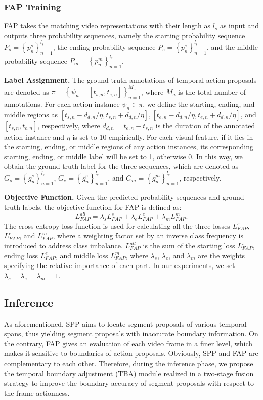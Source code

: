 \documentclass[10pt,twocolumn,letterpaper]{article}
\begin{document}
\subsubsection{ FAP Training}
FAP takes the matching video representations with their length as $l_{s}$  as input and outputs three probability sequences, namely the starting probability sequence 
$P_{s}=\left\{p_{n}^{s}\right\}_{n=1}^{l_s}$,  the ending probability sequence
$P_{e}=\left\{p_{n}^{e}\right\}_{n=1}^{l_s}$, and the middle probability sequence
 $P_{m}=\left\{p_{n}^{m}\right\}_{n=1}^{l_s}$.

\textbf{Label Assignment.} The ground-truth annotations of temporal action proposals are denoted as $\pi =
\left\{\psi_{n}=[t_{s,n},t_{e,n}]\right\}_{n=1}^{M_{a}}$, where
$M_{a}$ is the total number of annotations. For each action instance
$\psi_{n}\in\pi$, we define the starting, ending, and middle
regions as $[t_{s,n}-d_{d,n}/\eta,t_{s,n}+d_{d,n}/\eta], [t_{e,n}-d_{d,n}/\eta,t_{e,n}+d_{d,n}/\eta]$, and $[t_{s,n},t_{e,n}]$,
respectively, where $d_{d,n}=t_{e,n}-t_{s,n}$ is the duration of the
annotated action instance and $\eta$ is set to 10 empirically. For each visual feature, if it lies in the starting, ending, or
middle regions of any action instances, its corresponding
starting, ending, or middle label will be set to 1, otherwise 0. In this
way, we obtain the ground-truth label for the three sequences, which are denoted
as
 $G_{s}=\left\{g_{n}^{s}\right\}_{n=1}^{l_s}$, $G_{e}=\left\{g_{n}^{e}\right\}_{n=1}^{l_s}$, and $G_{m}=\left\{g_{n}^{m}\right\}_{n=1}^{l_s}$, respectively.

 \textbf{Objective Function.} Given the predicted probability sequences and ground-truth labels, the objective function for FAP is defined as:
 \begin{equation}
L_{FAP}^{all} = \lambda_{s}L_{FAP}^{s}+\lambda_{e}L_{FAP}^{e}+\lambda_{m}L_{FAP}^{m}.
\end{equation}
The cross-entropy loss function is used for calculating  all the  three losses $L_{FAP}^{s}$, $L_{FAP}^{e}$, and $L_{FAP}^{m}$, where a weighting factor set by an inverse class frequency is introduced to address class imbalance. $L_{FAP}^{all}$ is the sum of the starting loss $L_{FAP}^{s}$, ending loss $L_{FAP}^{e}$,
and middle loss $L_{FAP}^{m}$, where $\lambda_{s}$, $\lambda_{e}$, and
$\lambda_{m}$ are the weights specifying the relative importance
of each part. In our experiments, we set $\lambda_{s} =
\lambda_{e}=\lambda_{m}=1$.


\subsection{Inference} 
\label{TBA}
As aforementioned, SPP aims to locate segment proposals of various temporal spans, thus yielding segment proposals with inaccurate boundary information. On the contrary, FAP gives an evaluation of each video frame in a finer level, which makes it sensitive to boundaries of action proposals.
Obviously, SPP and FAP are complementary to each other. Therefore, during the inference phase, we propose the temporal boundary adjustment (TBA) module realized in a  two-stage fusion strategy to improve the boundary accuracy of segment proposals with respect to the frame actionness.
\end{document}
